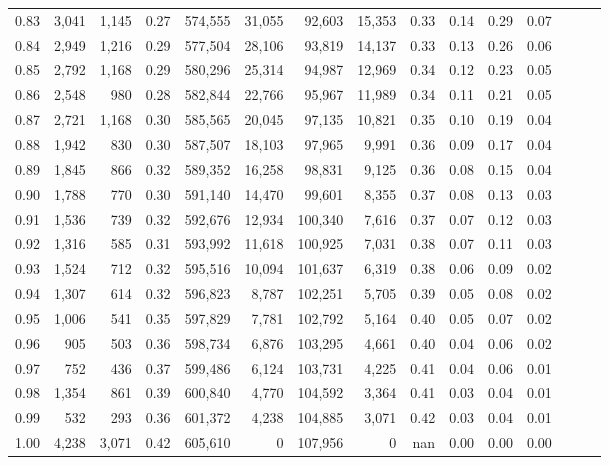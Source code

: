 \begin{tabular}{rrrrrrrrrrrrrrr}
0.83 &   3,041 &  1,145 &  0.27 &  574,555 &   31,055 &   92,603 &   15,353 &  0.33 &  0.14 &  0.29 &      0.07 \\
0.84 &   2,949 &  1,216 &  0.29 &  577,504 &   28,106 &   93,819 &   14,137 &  0.33 &  0.13 &  0.26 &      0.06 \\
0.85 &   2,792 &  1,168 &  0.29 &  580,296 &   25,314 &   94,987 &   12,969 &  0.34 &  0.12 &  0.23 &      0.05 \\
0.86 &   2,548 &    980 &  0.28 &  582,844 &   22,766 &   95,967 &   11,989 &  0.34 &  0.11 &  0.21 &      0.05 \\
0.87 &   2,721 &  1,168 &  0.30 &  585,565 &   20,045 &   97,135 &   10,821 &  0.35 &  0.10 &  0.19 &      0.04 \\
0.88 &   1,942 &    830 &  0.30 &  587,507 &   18,103 &   97,965 &    9,991 &  0.36 &  0.09 &  0.17 &      0.04 \\
0.89 &   1,845 &    866 &  0.32 &  589,352 &   16,258 &   98,831 &    9,125 &  0.36 &  0.08 &  0.15 &      0.04 \\
0.90 &   1,788 &    770 &  0.30 &  591,140 &   14,470 &   99,601 &    8,355 &  0.37 &  0.08 &  0.13 &      0.03 \\
0.91 &   1,536 &    739 &  0.32 &  592,676 &   12,934 &  100,340 &    7,616 &  0.37 &  0.07 &  0.12 &      0.03 \\
0.92 &   1,316 &    585 &  0.31 &  593,992 &   11,618 &  100,925 &    7,031 &  0.38 &  0.07 &  0.11 &      0.03 \\
0.93 &   1,524 &    712 &  0.32 &  595,516 &   10,094 &  101,637 &    6,319 &  0.38 &  0.06 &  0.09 &      0.02 \\
0.94 &   1,307 &    614 &  0.32 &  596,823 &    8,787 &  102,251 &    5,705 &  0.39 &  0.05 &  0.08 &      0.02 \\
0.95 &   1,006 &    541 &  0.35 &  597,829 &    7,781 &  102,792 &    5,164 &  0.40 &  0.05 &  0.07 &      0.02 \\
0.96 &     905 &    503 &  0.36 &  598,734 &    6,876 &  103,295 &    4,661 &  0.40 &  0.04 &  0.06 &      0.02 \\
0.97 &     752 &    436 &  0.37 &  599,486 &    6,124 &  103,731 &    4,225 &  0.41 &  0.04 &  0.06 &      0.01 \\
0.98 &   1,354 &    861 &  0.39 &  600,840 &    4,770 &  104,592 &    3,364 &  0.41 &  0.03 &  0.04 &      0.01 \\
0.99 &     532 &    293 &  0.36 &  601,372 &    4,238 &  104,885 &    3,071 &  0.42 &  0.03 &  0.04 &      0.01 \\
1.00 &   4,238 &  3,071 &  0.42 &  605,610 &        0 &  107,956 &        0 &   nan &  0.00 &  0.00 &      0.00 \\
\bottomrule
\end{tabular}
